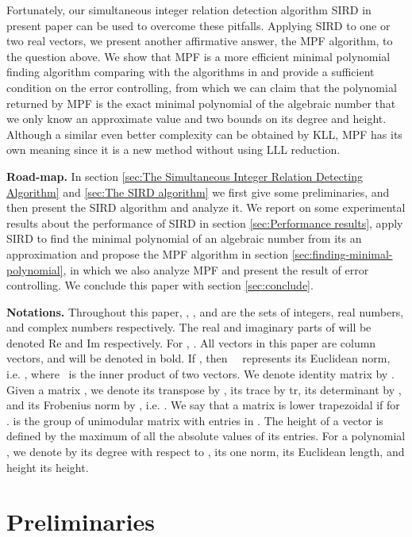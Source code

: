 \documentclass{sig-alternate}
\numberwithin{theorem}{section} \numberwithin{equation}{section}
\begin{document}
Fortunately, our simultaneous integer relation detection algorithm
SIRD in present paper can be used to overcome these pitfalls.
Applying SIRD to one or two real vectors, we present another
affirmative answer, the MPF algorithm, to the question above. We
show that MPF is a more efficient minimal polynomial finding
algorithm comparing with the algorithms in \cite{Jus1989,QFC2009}
and provide a sufficient condition on the error controlling, from
which we can claim that the
polynomial returned by MPF is the exact minimal polynomial of the algebraic number that we
only know an approximate value and two bounds on its degree and
height. Although a  similar even better complexity can be obtained
by KLL, MPF has its own meaning since it is a new method without using LLL reduction.

\textbf{{Road-map.}} In section \ref{sec:The Simultaneous Integer
Relation Detecting Algorithm} and \ref{sec:The SIRD algorithm} we
first give some preliminaries, and then present the SIRD algorithm
and analyze it. We report on some experimental results about the
performance of SIRD in section \ref{sec:Performance results}, apply
SIRD to find the minimal polynomial of an algebraic number from its
an approximation and propose the MPF algorithm in section
\ref{sec:finding-minimal-polynomial}, in which we also analyze  MPF
and present the result of error controlling. We conclude this paper
with section \ref{sec:conclude}.

\textbf{{Notations.}} Throughout this paper, ,
, and  are the sets of integers,  real
numbers, and complex numbers respectively. The real and imaginary
parts of  will be denoted Re and Im
respectively. For , . All vectors in
this paper are column vectors, and will be denoted in bold.  If
, then ~~represents
its Euclidean norm, i.e. , where~ is the inner product of two vectors.
We denote  identity matrix by . Given a matrix , we denote its transpose by , its trace by
tr, its determinant by , and its Frobenius norm by
 , i.e. . We say that a matrix  is lower trapezoidal if
 for .  is the group of
 unimodular matrix with entries in . The
height of a vector is defined by the maximum of all the absolute
values of its entries. For a polynomial , we denote by  its degree with respect to ,
 its one norm,
  its Euclidean length, and
height its height.


\section{Preliminaries}
\label{sec:The Simultaneous Integer Relation Detecting Algorithm}
\end{document}
